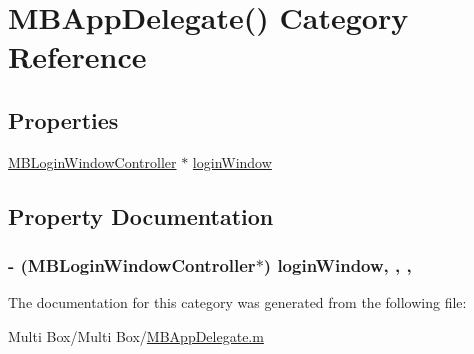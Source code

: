 \hypertarget{category_m_b_app_delegate_07_08}{\section{M\-B\-App\-Delegate() Category Reference}
\label{category_m_b_app_delegate_07_08}
}
\subsection*{Properties}
\begin{DoxyCompactItemize}
\item 
\hyperlink{interface_m_b_login_window_controller}{M\-B\-Login\-Window\-Controller} $\ast$ \hyperlink{category_m_b_app_delegate_07_08_a37ba081916b4b736ce4c3493bec2012e}{login\-Window}
\end{DoxyCompactItemize}


\subsection{Property Documentation}
\hypertarget{category_m_b_app_delegate_07_08_a37ba081916b4b736ce4c3493bec2012e}{
\subsubsection[{login\-Window}]{\setlength{\rightskip}{0pt plus 5cm}-\/ ({\bf M\-B\-Login\-Window\-Controller}$\ast$) login\-Window\hspace{0.3cm}{\ttfamily [read]}, {\ttfamily [write]}, {\ttfamily [nonatomic]}, {\ttfamily [strong]}}}\label{category_m_b_app_delegate_07_08_a37ba081916b4b736ce4c3493bec2012e}


The documentation for this category was generated from the following file\-:\begin{DoxyCompactItemize}
\item 
Multi Box/\-Multi Box/\hyperlink{_m_b_app_delegate_8m}{M\-B\-App\-Delegate.\-m}\end{DoxyCompactItemize}
